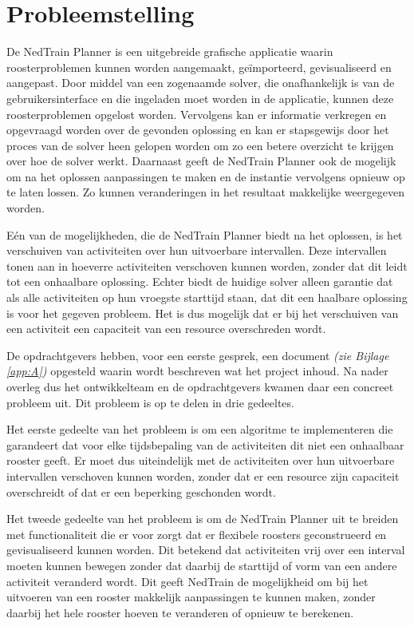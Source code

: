 \section{Probleemstelling}
\label{sec:probleemstelling}

De NedTrain Planner is een uitgebreide grafische applicatie waarin roosterproblemen kunnen worden aangemaakt, ge\"importeerd, gevisualiseerd en aangepast. Door middel van een zogenaamde solver, die onafhankelijk is van de gebruikersinterface en die ingeladen moet worden in de applicatie, kunnen deze roosterproblemen opgelost worden. Vervolgens kan er informatie verkregen en opgevraagd worden over de gevonden oplossing en kan er stapsgewijs door het proces van de solver heen gelopen worden om zo een betere overzicht te krijgen over hoe de solver werkt. Daarnaast geeft de NedTrain Planner ook de mogelijk om na het oplossen aanpassingen te maken en de instantie  vervolgens opnieuw op te laten lossen. Zo kunnen veranderingen in het resultaat makkelijke weergegeven worden.

E\'en van de mogelijkheden, die de NedTrain Planner biedt na het oplossen, is het verschuiven van activiteiten over hun uitvoerbare intervallen. Deze intervallen tonen aan in hoeverre activiteiten verschoven kunnen worden, zonder dat dit leidt tot een onhaalbare oplossing. Echter biedt de huidige solver alleen garantie dat als alle activiteiten op hun vroegste starttijd staan, dat dit een haalbare oplossing is voor het gegeven probleem. Het is dus mogelijk dat er bij het verschuiven van een activiteit een capaciteit van een resource overschreden wordt.

De opdrachtgevers hebben, voor een eerste gesprek, een document \emph{(zie Bijlage \ref{app:A})} opgesteld waarin wordt beschreven wat het project inhoud. Na nader overleg dus het ontwikkelteam en de opdrachtgevers kwamen daar een concreet probleem uit. Dit probleem is op te delen in drie gedeeltes. 

Het eerste gedeelte van het probleem is om een algoritme te implementeren die garandeert dat voor elke tijdsbepaling van de activiteiten dit niet een onhaalbaar rooster geeft. Er moet dus uiteindelijk met de activiteiten over hun uitvoerbare intervallen verschoven kunnen worden, zonder dat er een resource zijn capaciteit overschreidt of dat er een beperking geschonden wordt.

Het tweede gedeelte van het probleem is om de NedTrain Planner uit te breiden met functionaliteit die er voor zorgt dat er flexibele roosters geconstrueerd en gevisualiseerd kunnen worden. Dit betekend dat activiteiten vrij over een interval moeten kunnen bewegen zonder dat daarbij de starttijd of vorm van een andere activiteit veranderd wordt. Dit geeft NedTrain de mogelijkheid om bij het uitvoeren van een rooster makkelijk aanpassingen te kunnen maken, zonder daarbij het hele rooster hoeven te veranderen of opnieuw te berekenen.

